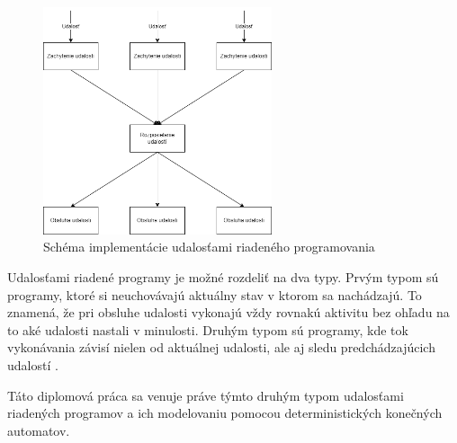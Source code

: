 \begin{figure}[!htbp]
  \centering
  \includegraphics[width=0.60\textwidth]{img/event-driven-schema.png}
  \caption{Schéma implementácie udalosťami riadeného programovania}
  \label{figure:event-driven-schema}
\end{figure}

\par
Udalosťami riadené programy je možné rozdeliť na dva typy. Prvým typom sú programy, ktoré si neuchovávajú aktuálny stav v ktorom sa nachádzajú. To znamená, že pri obsluhe udalosti vykonajú vždy rovnakú aktivitu bez ohľadu na to aké udalosti nastali v minulosti. Druhým typom sú programy, kde tok vykonávania závisí nielen od aktuálnej udalosti, ale aj sledu predchádzajúcich udalostí \cite{dashEventDrivenProgramming2011}.
\par Táto diplomová práca sa venuje práve týmto druhým typom udalosťami riadených programov a ich modelovaniu pomocou deterministických konečných automatov.